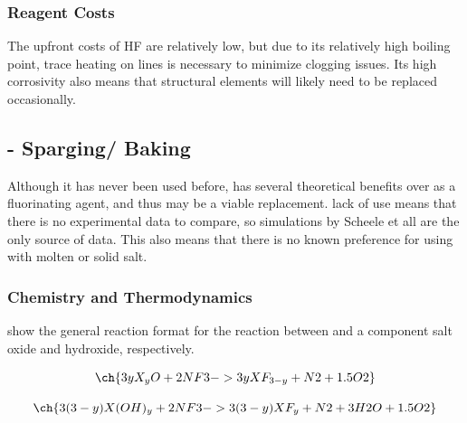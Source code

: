 \subsubsection{Reagent Costs}
\label{sec: hf reagent costs}

The upfront costs of HF are relatively low, but due to its relatively high
boiling point, trace heating on lines is necessary to minimize clogging
issues. Its high corrosivity also means that structural elements
will likely need to be replaced occasionally. \par

\subsection{- Sparging/ Baking}
\label{sec: nf3 sparging}

Although it has never been used before,  has several theoretical
benefits over  as a fluorinating
agent, and thus may be a viable replacement.  lack of use means
that there is no experimental data
to compare, so simulations by Scheele et all are the only source of
data. This also means that there is no
known preference for using  with molten or solid salt. \par

\subsubsection{Chemistry and Thermodynamics}
\label{sec: nf3 chemistry and thermodynamics}

 show
the general reaction format for the reaction between  and a component
salt oxide and hydroxide, respectively. \par

\begin{equation}
  \ch{3 y X_yO + 2 NF3 -> 3 y XF_{3 - y} + N2 + 1.5 O2 }
  \label{eq: NF3 oxide fluorination}
\end{equation}

\begin{equation}
  \ch{3 (3 - y) X (OH)_y + 2 NF3 -> 3 (3 - y) XF_y + N2 + 3 H2O + 1.5
  O2}
  \label{eq: NF3 hydroxide fluorination}
\end{equation}

